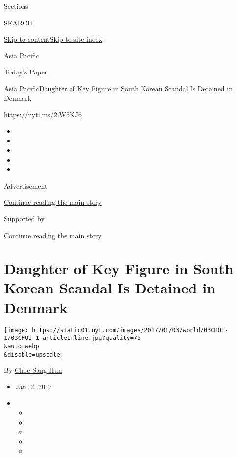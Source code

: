 Sections

SEARCH

\protect\hyperlink{site-content}{Skip to
content}\protect\hyperlink{site-index}{Skip to site index}

\href{https://www.nytimes.com/section/world/asia}{Asia Pacific}

\href{https://myaccount.nytimes.com/auth/login?response_type=cookie\&client_id=vi}{}

\href{https://www.nytimes.com/section/todayspaper}{Today's Paper}

\href{/section/world/asia}{Asia Pacific}\textbar{}Daughter of Key Figure
in South Korean Scandal Is Detained in Denmark

\url{https://nyti.ms/2iW5KJ6}

\begin{itemize}
\item
\item
\item
\item
\item
\end{itemize}

Advertisement

\protect\hyperlink{after-top}{Continue reading the main story}

Supported by

\protect\hyperlink{after-sponsor}{Continue reading the main story}

\hypertarget{daughter-of-key-figure-in-south-korean-scandal-is-detained-in-denmark}{%
\section{Daughter of Key Figure in South Korean Scandal Is Detained in
Denmark}\label{daughter-of-key-figure-in-south-korean-scandal-is-detained-in-denmark}}

\texttt{[image: https://static01.nyt.com/images/2017/01/03/world/03CHOI-1/03CHOI-1-articleInline.jpg?quality=75\\\&auto=webp\\\&disable=upscale]}

By \href{http://www.nytimes.com/by/choe-sang-hun}{Choe Sang-Hun}

\begin{itemize}
\item
  Jan. 2, 2017
\item
  \begin{itemize}
  \item
  \item
  \item
  \item
  \item
  \end{itemize}
\end{itemize}

